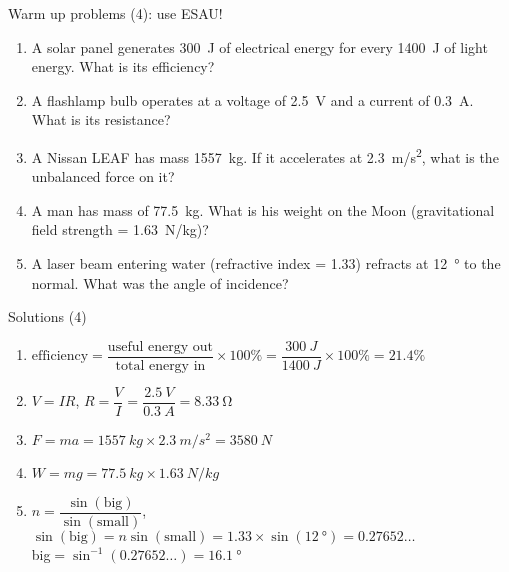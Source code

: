 \documentclass[14pt]{beamer}
\begin{document}
\begin{frame}{Warm up problems (4): use ESAU!}
\vspace*{-0.8em}\begin{enumerate}
\item\label{17.1} A solar panel generates \SI{300}{J} of electrical energy for every \SI{1400}{J} of light energy.  What is its efficiency?
\item\label{11.3} A flashlamp bulb operates at a voltage of \SI{2.5}{V} and a current of \SI{0.3}{A}.  What is its resistance?
\item\label{2.1} A Nissan LEAF has mass \SI{1557}{kg}.  If it accelerates at \SI{2.3}{m/s^{2}}, what is the unbalanced force on it?
\item\label{8.1} A man has mass of \SI{77.5}{kg}.  What is his weight on the Moon (gravitational field strength = \SI{1.63}{N/kg})?
\item\label{15.2} A laser beam entering water (refractive index = 1.33) refracts at \SI{12}{\degree} to the normal. What was the angle of incidence?
\end{enumerate}
\end{frame}

\begin{frame}{Solutions (4)}
\vspace*{-0.8em}\begin{enumerate}
\item\label{17.1} $\text{efficiency} = \dfrac{\text{useful energy out}}{\text{total energy in}}\times100\% = \dfrac{\SI{300}{J}}{\SI{1400}{J}}\times100\% = 21.4\%$
\item\label{11.3} $V=IR$, $R=\dfrac{V}{I}=\dfrac{\SI{2.5}{V}}{\SI{0.3}{A}}=\SI{8.33}{\ohm}$
\item\label{2.1} $F=ma = \SI{1557}{kg}\times\SI{2.3}{m/s^{2}}=\SI{3580}{N}$
\item\label{8.1} $W=mg=\SI{77.5}{kg}\times\SI{1.63}{N/kg}$
\item\label{15.2} $n=\dfrac{\sin(\text{big})}{\sin(\text{small})}$, $\sin(\text{big})=n \sin(\text{small})=1.33\times\sin(\SI{12}{\degree})=0.27652\ldots$\\
big$=\sin^{-1}(0.27652\ldots)=\SI{16.1}{\degree}$
\end{enumerate}
\end{frame}
\end{document}

